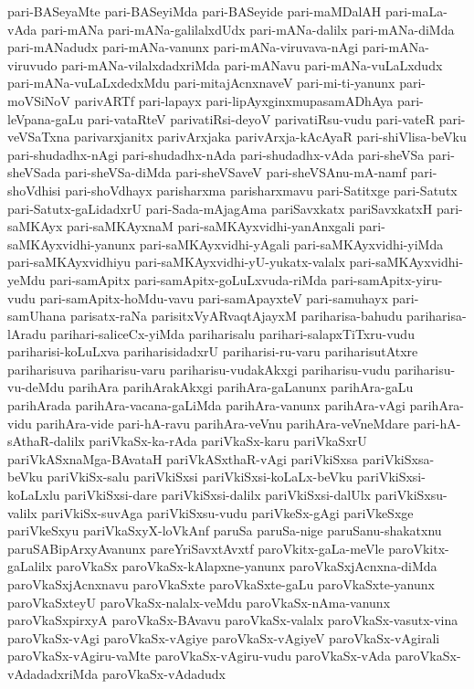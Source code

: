 {pari-BASeyaMte
pari-BASeyiMda
pari-BASeyide
pari-maMDalAH
pari-maLa-vAda
pari-mANa
pari-mANa-galilalxdUdx
pari-mANa-dalilx
pari-mANa-diMda
pari-mANadudx
pari-mANa-vanunx
pari-mANa-viruvava-nAgi
pari-mANa-viruvudo
pari-mANa-vilalxdadxriMda
pari-mANavu
pari-mANa-vuLaLxdudx
pari-mANa-vuLaLxdedxMdu
pari-mitajAcnxnaveV
pari-mi-ti-yanunx
pari-moVSiNoV
parivARTf
pari-lapayx
pari-lipAyxginxmupasamADhAya
pari-leVpana-gaLu
pari-vataRteV
parivatiRsi-deyoV
parivatiRsu-vudu
pari-vateR
pari-veVSaTxna
parivarxjanitx
parivArxjaka
parivArxja-kAcAyaR
pari-shiVlisa-beVku
pari-shudadhx-nAgi
pari-shudadhx-nAda
pari-shudadhx-vAda
pari-sheVSa
pari-sheVSada
pari-sheVSa-diMda
pari-sheVSaveV
pari-sheVSAnu-mA-namf
pari-shoVdhisi
pari-shoVdhayx
parisharxma
parisharxmavu
pari-Satitxge
pari-Satutx
pari-Satutx-gaLidadxrU
pari-Sada-mAjagAma
pariSavxkatx
pariSavxkatxH
pari-saMKAyx
pari-saMKAyxnaM
pari-saMKAyxvidhi-yanAnxgali
pari-saMKAyxvidhi-yanunx
pari-saMKAyxvidhi-yAgali
pari-saMKAyxvidhi-yiMda
pari-saMKAyxvidhiyu
pari-saMKAyxvidhi-yU-yukatx-valalx
pari-saMKAyxvidhi-yeMdu
pari-samApitx
pari-samApitx-goLuLxvuda-riMda
pari-samApitx-yiru-vudu
pari-samApitx-hoMdu-vavu
pari-samApayxteV
pari-samuhayx
pari-samUhana
parisatx-raNa
parisitxVyARvaqtAjayxM
pariharisa-bahudu
pariharisa-lAradu
parihari-saliceCx-yiMda
pariharisalu
parihari-salapxTiTxru-vudu
pariharisi-koLuLxva
pariharisidadxrU
pariharisi-ru-varu
pariharisutAtxre
pariharisuva
pariharisu-varu
pariharisu-vudakAkxgi
pariharisu-vudu
pariharisu-vu-deMdu
parihAra
parihArakAkxgi
parihAra-gaLanunx
parihAra-gaLu
parihArada
parihAra-vacana-gaLiMda
parihAra-vanunx
parihAra-vAgi
parihAra-vidu
parihAra-vide
pari-hA-ravu
parihAra-veVnu
parihAra-veVneMdare
pari-hA-sAthaR-dalilx
pariVkaSx-ka-rAda
pariVkaSx-karu
pariVkaSxrU
pariVkASxnaMga-BAvataH
pariVkASxthaR-vAgi
pariVkiSxsa
pariVkiSxsa-beVku
pariVkiSx-salu
pariVkiSxsi
pariVkiSxsi-koLaLx-beVku
pariVkiSxsi-koLaLxlu
pariVkiSxsi-dare
pariVkiSxsi-dalilx
pariVkiSxsi-dalUlx
pariVkiSxsu-valilx
pariVkiSx-suvAga
pariVkiSxsu-vudu
pariVkeSx-gAgi
pariVkeSxge
pariVkeSxyu
pariVkaSxyX-loVkAnf
paruSa
paruSa-nige
paruSanu-shakatxnu
paruSABipArxyAvanunx
pareYriSavxtAvxtf
paroVkitx-gaLa-meVle
paroVkitx-gaLalilx
paroVkaSx
paroVkaSx-kAlapxne-yanunx
paroVkaSxjAcnxna-diMda
paroVkaSxjAcnxnavu
paroVkaSxte
paroVkaSxte-gaLu
paroVkaSxte-yanunx
paroVkaSxteyU
paroVkaSx-nalalx-veMdu
paroVkaSx-nAma-vanunx
paroVkaSxpirxyA
paroVkaSx-BAvavu
paroVkaSx-valalx
paroVkaSx-vasutx-vina
paroVkaSx-vAgi
paroVkaSx-vAgiye
paroVkaSx-vAgiyeV
paroVkaSx-vAgirali
paroVkaSx-vAgiru-vaMte
paroVkaSx-vAgiru-vudu
paroVkaSx-vAda
paroVkaSx-vAdadadxriMda
paroVkaSx-vAdadudx
}
